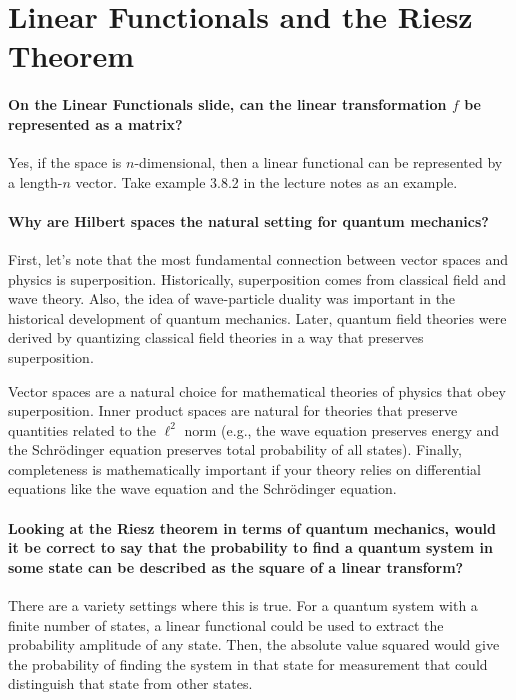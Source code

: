 \documentclass[10pt,english]{article}
\begin{document}
\section{Linear Functionals and the Riesz Theorem}

\paragraph{On the Linear Functionals slide, can the linear transformation $f$ be represented as a matrix?} Yes, if the space is $n$-dimensional, then a linear functional can be represented by a length-$n$ vector. Take example 3.8.2 in the lecture notes as an example.

\paragraph{Why are Hilbert spaces the natural setting for quantum mechanics?}

First, let's note that the most fundamental connection between vector spaces and physics is superposition.
Historically, superposition comes from classical field and wave theory.
Also, the idea of wave-particle duality was important in the historical development of quantum mechanics.
Later, quantum field theories were derived by quantizing classical field theories in a way that preserves superposition.

Vector spaces are a natural choice for mathematical theories of physics that obey superposition.
Inner product spaces are natural for theories that preserve quantities related to the $\ell^2$ norm (e.g., the wave equation preserves energy and the Schr\"{o}dinger equation preserves total probability of all states).
Finally, completeness is mathematically important if your theory relies on differential equations like the wave equation and the Schr\"{o}dinger equation.


\paragraph{Looking at the Riesz theorem in terms of quantum mechanics, would it be correct to say that the probability to find a quantum system in some state can be described as the square of a linear transform?}

There are a variety settings where this is true.
For a quantum system with a finite number of states, a linear functional could be used to extract the probability amplitude of any state.  Then, the absolute value squared would give the probability of finding the system in that state for measurement that could distinguish that state from other states.
\end{document}
